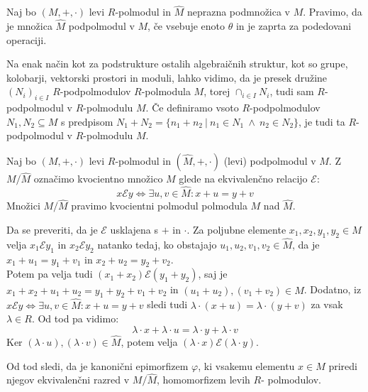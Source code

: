 \documentclass[mat1]{fmfdelo}
\begin{document}
\begin{definicija}
	Naj bo $(M, +, \cdot)$ levi $R$-polmodul in $\widehat{M}$ neprazna podmnožica v $M$. Pravimo, da je množica $\widehat{M}$ podpolmodul v $M$, če vsebuje enoto $\theta$ in je zaprta za podedovani operaciji.
\end{definicija}

Na enak način kot za podstrukture ostalih algebraičnih struktur, kot so grupe, kolobarji, vektorski prostori in moduli, lahko vidimo, da je presek družine $(N_i)_{i\in I}$ $R$-podpolmodulov $R$-polmodula $M$, torej $\cap_{i\in I}N_i$, tudi sam $R$-podpolmodul v $R$-polmodulu $M$. Če definiramo vsoto $R$-podpolmodulov $N_1,N_2\subseteq M$ s predpisom $N_1 + N_2 =\{n_1 + n_2~|~n_1\in N_1~\land~n_2\in N_2\}$, je tudi ta $R$-podpolmodul v $R$-polmodulu $M$.

\begin{definicija}
	Naj bo $(M, +, \cdot)$ levi $R$-polmodul in $(\widehat{M}, +, \cdot)$ (levi) podpolmodul v $M$. Z $M/ \widehat{M}$ označimo kvocientno množico $M$ glede na ekvivalenčno relacijo $\mathcal{E}$: $$x\mathcal{E}y \iff \exists u, v\in\widehat{M}: x + u = y + v$$ Množici $M/\widehat{M}$ pravimo kvocientni polmodul polmodula $M$ nad $\widehat{M}$.
\end{definicija}

Da se preveriti, da je $\mathcal{E}$ usklajena s $+$ in $\cdot$. Za poljubne elemente $x_1, x_2, y_1, y_2 \in M$ velja $x_1\mathcal{E}y_1$ in $x_2\mathcal{E}y_2$ natanko tedaj, ko obstajajo $u_1, u_2, v_1, v_2 \in \widehat{M}$, da je $x_1 + u_1 = y_1 + v_1$ in $ x_2 + u_2 = y_2 + v_2$. \\

Potem pa velja tudi $(x_1 + x_2)\mathcal{E}(y_1 + y_2)$, saj je $x_1 + x_2 + u_1 + u_2 = y_1 + y_2 + v_1 + v_2$ in $(u_1 + u_2), (v_1 + v_2)\in \widehat{M}$. Dodatno, iz $x\mathcal{E}y \iff \exists u, v\in\widehat{M}: x + u = y + v$ sledi tudi $\lambda\cdot (x + u) = \lambda\cdot (y + v)$ za vsak $\lambda\in R$. Od tod pa vidimo: $$\lambda\cdot x + \lambda\cdot u = \lambda\cdot y + \lambda\cdot v$$ Ker $(\lambda\cdot u), (\lambda\cdot v)\in \widehat{M}$, potem velja $(\lambda\cdot x) \mathcal{E} (\lambda\cdot y)$.

Od tod sledi, da je kanonični epimorfizem $\varphi$, ki vsakemu elementu $x\in M$ priredi njegov ekvivalenčni razred v $M/\widehat{M}$, homomorfizem levih $R$- polmodulov.
\end{document}
